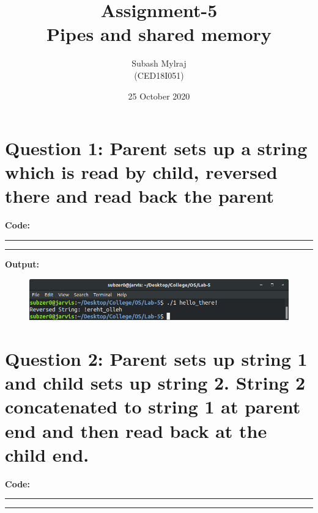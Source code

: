 \documentclass{article}
\title{Assignment-5\\Pipes and shared memory}
\author{Subash Mylraj \\(CED18I051) }
\date{25 October 2020}
\begin{document}
\maketitle



\section*{Question 1: Parent sets up a string which is read by child, reversed there and read back the parent}
\bigskip
\bigskip

\par\noindent
\textbf{\Large Code: }
\smallskip
\par\noindent\rule{\textwidth}{0.4pt}

\par\noindent\rule{\textwidth}{0.4pt}

\bigskip
\noindent
\textbf{\Large Output:}

\begin{figure}[h]
	\includegraphics[width=\textwidth]{output/1.png}
\end{figure}
\bigskip

\section*{Question 2: Parent sets up string 1 and child sets up string 2. String 2 concatenated to string 1 at parent end and then read back at the child end.}
\bigskip
\bigskip

\par\noindent
\textbf{\Large Code: }
\smallskip
\par\noindent\rule{\textwidth}{0.4pt}

\par\noindent\rule{\textwidth}{0.4pt}
\end{document}
